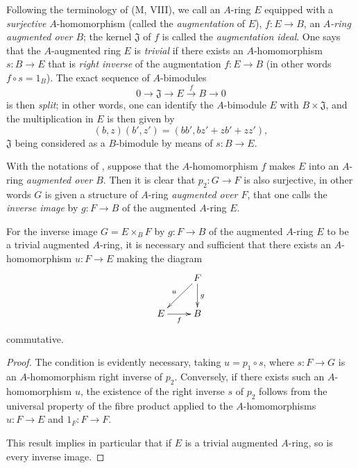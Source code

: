 \begin{env}[18.1.4]
\label{0.18.1.4}
Following the terminology of (M, VIII), we call an $A$-ring $E$ equipped with a \emph{surjective} $A$-homomorphism (called the \emph{augmentation} of $E$), $f:E\to B$, an \emph{$A$-ring augmented over $B$}; the kernel $\mathfrak{J}$ of $f$ is called the \emph{augmentation ideal}.
One says that the $A$-augmented ring $E$ is \emph{trivial} if there exists an $A$-homomorphism $s:B\to E$ that is \emph{right inverse} of the augmentation $f:E\to B$ (in other words $f\circ s=1_B$).
The exact sequence of $A$-bimodules
\[
  0\to\mathfrak{J}\to E\xrightarrow{f} B\to 0
\]
is then \emph{split}; in other words, one can identify the $A$-bimodule $E$ with $B\times\mathfrak{J}$, and the multiplication in $E$ is then given by
\[
  (b,z)(b',z')=(bb',bz'+zb'+zz'),
\]
$\mathfrak{J}$ being considered as a $B$-bimodule by means of $s:B\to E$.
\end{env}

\begin{env}[18.1.5]
\label{0.18.1.5}
With the notations of , suppose that the $A$-homomorphism $f$ makes $E$ into an $A$-ring \emph{augmented over $B$}.
Then it is clear that $p_2:G\to F$ is also surjective, in other words $G$ is given a structure of $A$-ring \emph{augmented over $F$}, that one calls the \emph{inverse image} by $g:F\to B$ of the augmented $A$-ring $E$.
\end{env}

\begin{proposition}[18.1.6]
\label{0.18.1.6}
For the inverse image $G=E\times_B F$ by $g:F\to B$ of the augmented $A$-ring $E$ to be a trivial augmented $A$-ring, it is necessary and sufficient that there exists an $A$-homomorphism $u:F\to E$ making the diagram
  \[
  \xymatrix{
    & F\ar[ld]_u\ar[d]^g\\
    E\ar[r]_f & B
  }
  \]
commutative.
\end{proposition}

\begin{proof}
The condition is evidently necessary, taking $u=p_1\circ s$, where $s:F\to G$ is an $A$-homomorphism right inverse of $p_2$.
Conversely, if there exists such an $A$-homomorphism $u$, the existence of the right inverse $s$ of $p_2$ follows from the universal property of the fibre product  applied to the $A$-homomorphisms $u:F\to E$ and $1_F:F\to F$.

This result implies in particular that if $E$ is a trivial augmented $A$-ring, so is every inverse image.
\end{proof}

